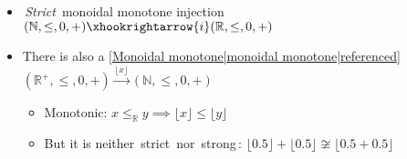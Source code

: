 
\begin{itemize}
    \item \,\emph{Strict}\, monoidal monotone injection $(\mathbb{N},\leq, 0, +) \xhookrightarrow{i} (\mathbb{R},\leq,0,+)$
    \item There is also a \ref{Monoidal monotone|monoidal monotone|referenced} $(\mathbb{R}^+,\leq, 0, +) \xrightarrow{\lfloor x \rfloor} (\mathbb{N},\leq,0,+)$
          \begin{itemize}
            \item Monotonic: $x \leq_\mathbb{R} y \implies \lfloor x \rfloor \leq \lfloor y \rfloor$
            \item But it is neither \,strict\, nor \,strong\,: $\lfloor 0.5 \rfloor + \lfloor 0.5 \rfloor \not \cong \lfloor 0.5+0.5 \rfloor$
          \end{itemize}
  \end{itemize}